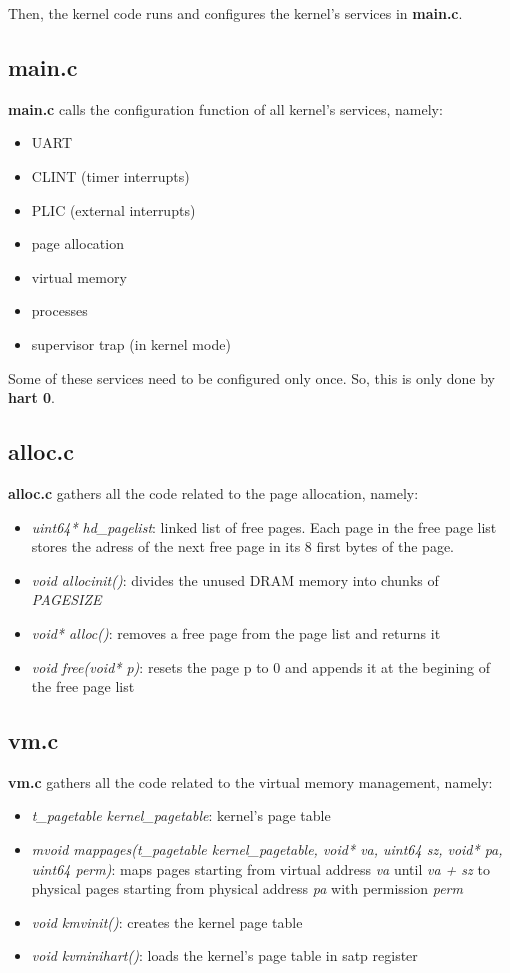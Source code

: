 \documentclass[10pt, a4paper]{article}
\begin{document}
Then, the kernel code runs and configures the kernel's services in \textbf{main.c}.

\subsection{main.c}

\textbf{main.c} calls the configuration function of all kernel's services, namely:
\begin{itemize}
\item UART
\item CLINT (timer interrupts)
\item PLIC (external interrupts)
\item page allocation
\item virtual memory
\item processes
\item supervisor trap (in kernel mode)
\end{itemize}

Some of these services need to be configured only once. So, this is only done by \textbf{hart 0}.

\subsection{alloc.c}

\textbf{alloc.c} gathers all the code related to the page allocation, namely:
\begin{itemize}
\item \textit{uint64* hd\_{}pagelist}: linked list of free pages. Each page in the free page list stores the adress of the next free page in its 8 first bytes of the page. 
\item \textit{void allocinit()}: divides the unused DRAM memory into chunks of \textit{PAGESIZE}
\item \textit{void* alloc()}: removes a free page from the page list and returns it
\item \textit{void free(void* p)}: resets the page p to 0 and appends it at the begining of the free page list 
\end{itemize}

\subsection{vm.c}

\textbf{vm.c} gathers all the code related to the virtual memory management, namely:

\begin{itemize}
\item \textit{t\_{}pagetable kernel\_{}pagetable}: kernel's page table
\item \textit{mvoid mappages(t\_{}pagetable kernel\_{}pagetable, void* va, uint64 sz, void* pa, uint64 perm)}: maps  pages starting from virtual address \textit{va} until \textit{va + sz} to physical pages starting from physical address \textit{pa} with permission \textit{perm}
\item \textit{void kmvinit()}: creates the kernel page table
\item \textit{void kvminihart()}: loads the kernel's page table in satp register
\end{itemize}
\end{document}
